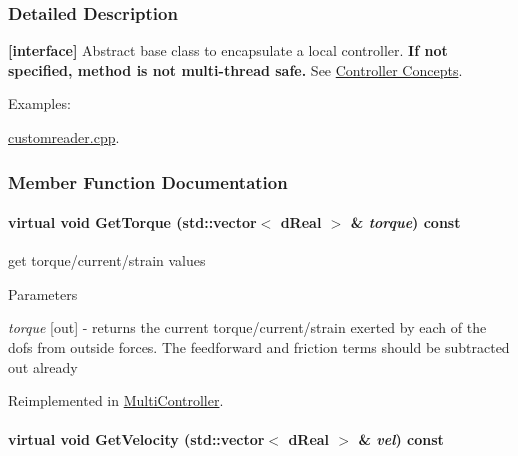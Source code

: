 \subsubsection{Detailed Description}
{\bfseries \mbox{[}interface\mbox{]}} Abstract base class to encapsulate a local controller. {\bfseries If not specified, method is not multi-\/thread safe.} See \hyperlink{arch__controller}{Controller Concepts}. \begin{Desc}
\item[Examples: ]\par


\hyperlink{customreader_8cpp-example}{customreader.cpp}.

\end{Desc}


\subsubsection{Member Function Documentation}
\hypertarget{classOpenRAVE_1_1ControllerBase_a5850b39ddc68841ef2961c2eb7bf7b8f}{
\paragraph[{GetTorque}]{\setlength{\rightskip}{0pt plus 5cm}virtual void GetTorque (std::vector$<$ dReal $>$ \& {\em torque}) const}\hfill}
\label{classOpenRAVE_1_1ControllerBase_a5850b39ddc68841ef2961c2eb7bf7b8f}
get torque/current/strain values 
\begin{DoxyParams}{Parameters}
\item[{\em torque}]\mbox{[}out\mbox{]} -\/ returns the current torque/current/strain exerted by each of the dofs from outside forces. The feedforward and friction terms should be subtracted out already \end{DoxyParams}


Reimplemented in \hyperlink{classOpenRAVE_1_1MultiController_aa9cb5e097c6ecb5d0b157f9b7c581085}{MultiController}.

\hypertarget{classOpenRAVE_1_1ControllerBase_aa7df84105fae386c84139ce5c5b7f1f1}{
\paragraph[{GetVelocity}]{\setlength{\rightskip}{0pt plus 5cm}virtual void GetVelocity (std::vector$<$ dReal $>$ \& {\em vel}) const}\hfill}
\label{classOpenRAVE_1_1ControllerBase_aa7df84105fae386c84139ce5c5b7f1f1}


